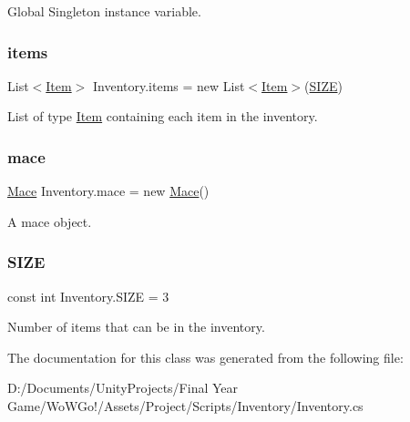 Global Singleton instance variable. 

\mbox{\label{class_inventory_a293c252e7e0964f7df6cce377d22f247}} 
\subsubsection{\texorpdfstring{items}{items}}
{\footnotesize\ttfamily List$<$\mbox{\hyperlink{class_item}{Item}}$>$ Inventory.\+items = new List$<$\mbox{\hyperlink{class_item}{Item}}$>$(\mbox{\hyperlink{class_inventory_aff412f987227c8b93c3165ba7dbdf9bc}{S\+I\+ZE}})\hspace{0.3cm}{\ttfamily [private]}}



List of type \mbox{\hyperlink{class_item}{Item}} containing each item in the inventory. 

\mbox{\label{class_inventory_a3bf7a92ae58edc99043f877221812e80}} 
\subsubsection{\texorpdfstring{mace}{mace}}
{\footnotesize\ttfamily \mbox{\hyperlink{class_mace}{Mace}} Inventory.\+mace = new \mbox{\hyperlink{class_mace}{Mace}}()\hspace{0.3cm}{\ttfamily [private]}}



A mace object. 

\mbox{\label{class_inventory_aff412f987227c8b93c3165ba7dbdf9bc}} 
\subsubsection{\texorpdfstring{SIZE}{SIZE}}
{\footnotesize\ttfamily const int Inventory.\+S\+I\+ZE = 3}



Number of items that can be in the inventory. 



The documentation for this class was generated from the following file\+:\begin{DoxyCompactItemize}
\item 
D\+:/\+Documents/\+Unity\+Projects/\+Final Year Game/\+Wo\+W\+Go!/\+Assets/\+Project/\+Scripts/\+Inventory/Inventory.\+cs\end{DoxyCompactItemize}

